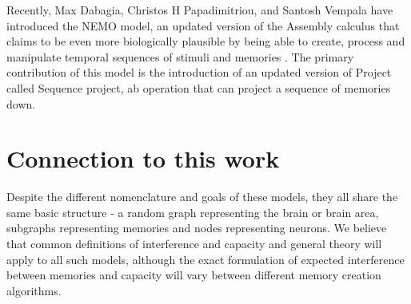 Recently, Max Dabagia, Christos H Papadimitriou, and Santosh Vempala have introduced the NEMO model, an updated version of the Assembly calculus that claims to be even more biologically plausible by being able to create, process and manipulate temporal sequences of stimuli and memories \cite{dabagia2023computation}. The primary contribution of this model is the introduction of an updated version of Project called Sequence project, ab operation that can project a sequence of memories down.  

\section{Connection to this work}

Despite the different nomenclature and goals of these models, they all share the same basic structure - a random graph representing the brain or brain area, subgraphs representing memories and nodes representing neurons. We believe that common definitions of interference and capacity and general theory will apply to all such models, although the exact formulation of expected interference between memories and capacity will vary between different memory creation algorithms. 
